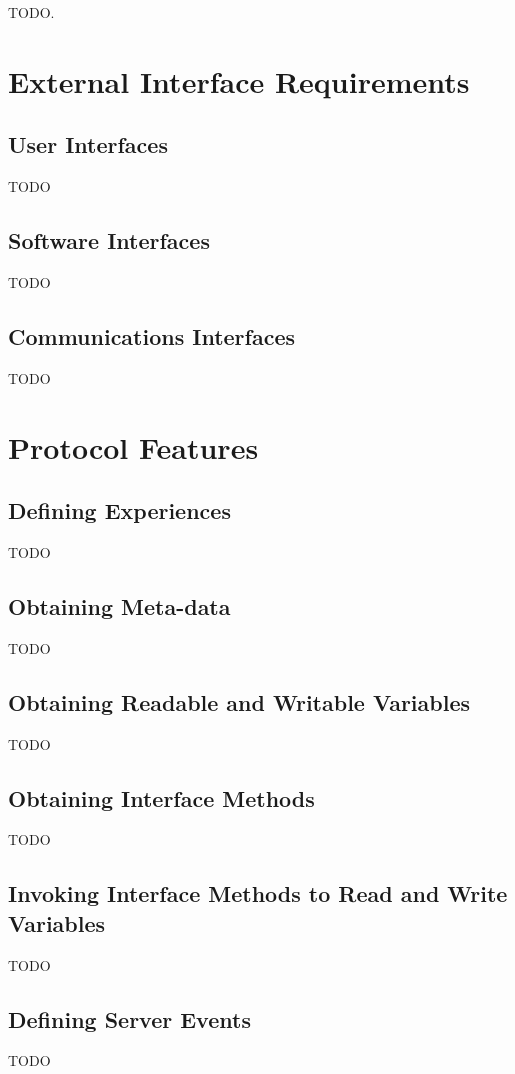 TODO.


\chapter{External Interface Requirements}
\label{External Interface Requirements}

\section{User Interfaces}
TODO

\section{Software Interfaces}
TODO

\section{Communications Interfaces}
TODO


\chapter{Protocol Features}
\label{System Features}

\section{Defining Experiences}
TODO

\section{Obtaining Meta-data}
TODO

\section{Obtaining Readable and Writable Variables}
TODO

\section{Obtaining Interface Methods}
TODO

\section{Invoking Interface Methods to Read and Write Variables}
TODO

\section{Defining Server Events}
TODO

